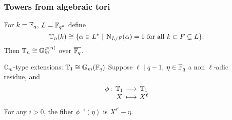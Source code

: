 \documentclass[12pt]{beamer}
\begin{document}

\begin{frame}
	\frametitle{Towers from algebraic tori}
	
	\begin{definition}
		For $k=\mathbb{F}_q$, $L=\mathbb{F}_{q^n}$ define 
		\begin{equation*}
			\label{eq:Tn}
			\mathbb{T}_n(k) \cong \{\alpha\in L^\ast \;|\; \operatorname{N}_{L/F}(\alpha) = 1 \text{ for all } k\subset F\subsetneq L \}.
		\end{equation*}
		Then $\mathbb{T}_n \cong \mathbb{G}_m^{\varphi(n)}$ over $\overline{\mathbb{F}_q}$.
	\end{definition}
	\vspace*{5mm}
	\begin{exampleblock}{$\mathbb{G}_m$-type extensions: $\mathbb{T}_1 \cong \mathbb{G}_m(\mathbb{F}_q)$}
		Suppose $\ell \mid q-1$, $\eta \in \mathbb{F}_q$ a non $\ell$-adic residue, and
		\[
		\setlength{\arraycolsep}{2pt}
		\begin{array}{cccc}
			\phi: & \mathbb{T}_1 & \longrightarrow & \mathbb{T}_1 \\
			& X & \longmapsto & X^\ell
		\end{array}
		\]
		For any $i>0$, the fiber $\phi^{-i}(\eta)$ is $X^{\ell^i}-\eta$.
	\end{exampleblock}
\end{frame}

\end{document}
